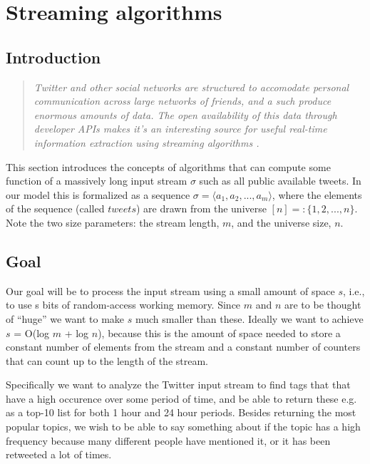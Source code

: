 \section{Streaming algorithms}\label{related work}
\subsection{Introduction}\label{algo-intro}
\begin{quote}\textit{
Twitter and other social networks are structured to accomodate personal communication across large networks of friends, and a such produce enormous amounts of data. The open availability of this data through developer APIs makes it's an interesting source for useful real-time information extraction using streaming algorithms \cite{genderprediction}. 
}
\end{quote}

This section introduces the concepts of algorithms that can compute some function of a massively long input stream $\sigma$ such as all public available tweets. In our model this is formalized as a sequence $\sigma = \langle a_{1}, a_{2},...,a_{m}\rangle $, where the elements of the sequence (called $tweets$) are drawn from the universe $[n] =: \{1, 2,..., n\}$. Note the two size parameters: the stream length, $m$, and the universe size, $n$.
\subsection{Goal}\label{algo-goals}
Our goal will be to process the input stream using a small amount of space $s$, i.e., to use s bits of random-access working memory. Since $m$ and $n$ are to be thought of ``huge'' we want to make $s$ much smaller than these. Ideally we want to achieve $s$ = O(log $m$ + log $n$), because this is the amount of space needed to store a constant number of elements from the stream and a constant number of counters that can count up to the length of the stream. \cite{Amit}

Specifically we want to analyze the Twitter input stream to find tags that that have a high occurence over some period of time, and be able to return these e.g. as a top-10 list for both 1 hour and 24 hour periods. Besides returning the most popular topics, we wish to be able to say something about if the topic has a high frequency because many different people have mentioned it, or it has been retweeted a lot of times.



